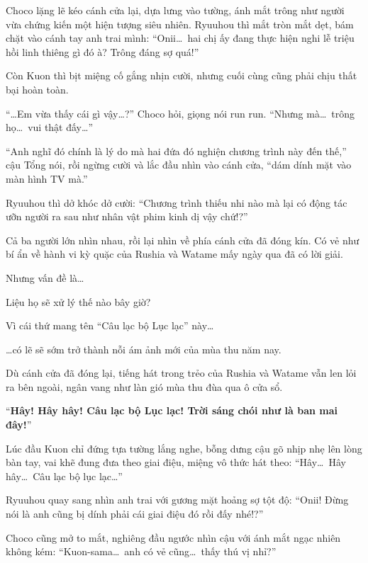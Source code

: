 \documentclass[../main.tex]{subfiles}
\begin{document}
Choco lặng lẽ kéo cánh cửa lại, dựa lưng vào tường, ánh mắt trông như người vừa chứng kiến một hiện tượng siêu nhiên. Ryuuhou thì mắt tròn mắt dẹt, bám chặt vào cánh tay anh trai mình: ``Onii\dots\ hai chị ấy đang thực hiện nghi lễ triệu hồi linh thiêng gì đó à? Trông đáng sợ quá!''

Còn Kuon thì bịt miệng cố gắng nhịn cười, nhưng cuối cùng cũng phải chịu thất bại hoàn toàn.

``\dots Em vừa thấy cái gì vậy\dots?'' Choco hỏi, giọng nói run run. ``Nhưng mà\dots\ trông họ\dots\ vui thật đấy\dots''

``Anh nghĩ đó chính là lý do mà hai đứa đó nghiện chương trình này đến thế,'' cậu Tổng nói, rồi ngừng cười và lắc đầu nhìn vào cánh cửa, ``dám dính mặt vào màn hình TV mà.''

Ryuuhou thì dở khóc dở cười: ``Chương trình thiếu nhi nào mà lại có động tác ưỡn người ra sau như nhân vật phim kinh dị vậy chứ!?''

Cả ba người lớn nhìn nhau, rồi lại nhìn về phía cánh cửa đã đóng kín. Có vẻ như bí ẩn về hành vi kỳ quặc của Rushia và Watame mấy ngày qua đã có lời giải.

Nhưng vấn đề là\dots

Liệu họ sẽ xử lý thế nào bây giờ?

Vì cái thứ mang tên ``Câu lạc bộ Lục lạc'' này\dots

\dots có lẽ sẽ sớm trở thành nỗi ám ảnh mới của mùa thu năm nay.


\omk

Dù cánh cửa đã đóng lại, tiếng hát trong trẻo của Rushia và Watame vẫn len lỏi ra bên ngoài, ngân vang như làn gió mùa thu đùa qua ô cửa sổ.

``\textbf{Hây! Hây hây! Câu lạc bộ Lục lạc! Trời sáng chói như là ban mai đây!}''

Lúc đầu Kuon chỉ đứng tựa tường lắng nghe, bỗng dưng cậu gõ nhịp nhẹ lên lòng bàn tay, vai khẽ đung đưa theo giai điệu, miệng vô thức hát theo: ``Hây\dots\ Hây hây\dots\ Câu lạc bộ lục lạc\dots''

Ryuuhou quay sang nhìn anh trai với gương mặt hoảng sợ tột độ: ``Onii! Đừng nói là anh cũng bị dính phải cái giai điệu đó rồi đấy nhé!?''

Choco cũng mở to mắt, nghiêng đầu ngước nhìn cậu với ánh mắt ngạc nhiên không kém: ``Kuon-sama\dots\ anh có vẻ cũng\dots\ thấy thú vị nhỉ?''
\end{document}

